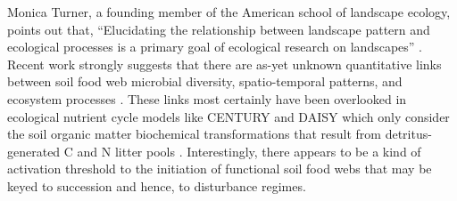 Monica Turner, a founding member of the American school of landscape ecology, points out that, \enquote{Elucidating the relationship between landscape pattern and ecological processes is a primary goal of ecological research on landscapes} \citep{turner_landscape_1989}. Recent work strongly suggests that there are as-yet unknown quantitative links between soil food web microbial diversity, spatio-temporal patterns, and ecosystem processes \citep{rygiewicz_soil_2010, compant_stephane_plant_2010, prosser_role_2007}. These links most certainly have been overlooked in ecological nutrient cycle models like CENTURY and DAISY which only consider the soil organic matter biochemical transformations that result from detritus-generated C and N litter pools \citep{smith_evaluation_1997, de_vries_soil_2013, kirschbaum_modelling_2002, roose_mathematical_2008}. Interestingly, there appears to be a kind of activation threshold to the initiation of functional soil food webs that may be keyed to succession and hence, to disturbance regimes.  
